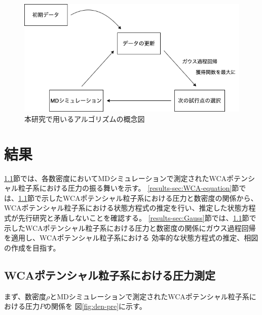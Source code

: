 \documentclass[titlepage]{jsreport}
\begin{document}
{{{\begin{figure}[htbp]
    \begin{center}
        \includegraphics[width=14cm]{fig/algorithm.png}
    \end{center}
    \caption{本研究で用いるアルゴリズムの概念図}
    \label{fig:algorithm}
\end{figure}




\chapter{結果} \label{chap:results}
\ref{results-sec:WCA-press}節では、各数密度においてMDシミュレーションで測定されたWCAポテンシャル粒子系における圧力の振る舞いを示す。
\ref{results-sec:WCA-equation}節では、\ref{results-sec:WCA-press}節で示したWCAポテンシャル粒子系における圧力と数密度の関係から、WCAポテンシャル粒子系における状態方程式の推定を行い、推定した状態方程式が先行研究と矛盾しないことを確認する。
\ref{results-sec:Gauss}節では、\ref{results-sec:WCA-press}節で示したWCAポテンシャル粒子系における圧力と数密度の関係にガウス過程回帰を適用し、WCAポテンシャル粒子系における
効率的な状態方程式の推定、相図の作成を目指す。



\section{WCAポテンシャル粒子系における圧力測定}\label{results-sec:WCA-press}
まず、数密度$\rho$とMDシミュレーションで測定されたWCAポテンシャル粒子系における圧力$P$の関係を
図\ref{fig:den-pre}に示す。

}}}
\end{document}
